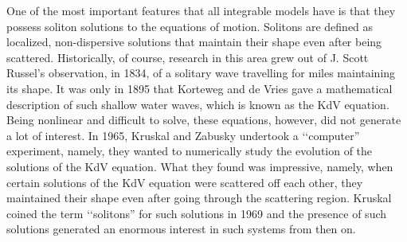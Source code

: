 \documentclass[a4paper,11pt]{article}
\begin{document}
One of the most important features that all integrable models have is
that they possess soliton solutions to the equations of
motion. Solitons are defined as localized, non-dispersive solutions
that maintain their shape even after being scattered. Historically, of
course, research in this area grew out of J. Scott Russel's
observation, in 1834, of a solitary wave travelling for miles
maintaining its shape. It was only in 1895 that Korteweg and de Vries
gave a mathematical description of such shallow water waves, which is
known as the KdV equation. Being nonlinear and difficult to solve,
these equations, however, did not generate a lot of interest. In 1965,
Kruskal and Zabusky undertook a \lq\lq computer'' experiment, namely,
they wanted to numerically study the evolution of the solutions of the
KdV equation. What they found was impressive, namely, when certain
solutions of the KdV equation were scattered off each other, they
maintained their shape even after going through the scattering
region. Kruskal coined the term \lq\lq solitons'' for such solutions
in 1969 and the presence of such solutions generated an enormous
interest in such systems from then on. 

\end{document}
